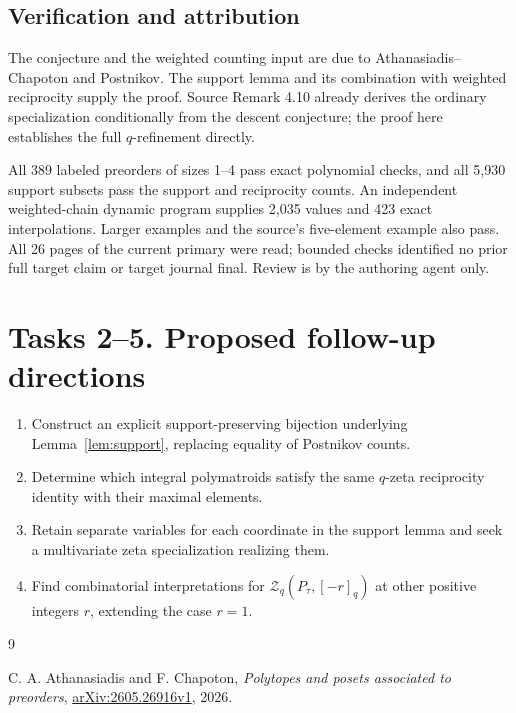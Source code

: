 \documentclass[11pt]{article}
\begin{document}
\subsection*{Verification and attribution}
The conjecture and the weighted counting input are due to
Athanasiadis--Chapoton and Postnikov. The support lemma and its
combination with weighted reciprocity supply the proof. Source
Remark 4.10 already derives the ordinary specialization conditionally
from the descent conjecture; the proof here establishes the full
$q$-refinement directly.

All 389 labeled preorders of sizes 1--4 pass exact polynomial checks,
and all 5,930 support subsets pass the support and reciprocity counts.
An independent weighted-chain dynamic program supplies 2,035 values
and 423 exact interpolations. Larger examples and the source's
five-element example also pass. All 26 pages of the current primary
were read; bounded checks identified no prior full target claim or
target journal final. Review is by the authoring agent only.

\section*{Tasks 2--5. Proposed follow-up directions}
\begin{enumerate}[label=\textbf{Task \arabic*.},start=2,leftmargin=*]
\item Construct an explicit support-preserving bijection underlying
Lemma~\ref{lem:support}, replacing equality of Postnikov counts.
\item Determine which integral polymatroids satisfy the same
$q$-zeta reciprocity identity with their maximal elements.
\item Retain separate variables for each coordinate in the support
lemma and seek a multivariate zeta specialization realizing them.
\item Find combinatorial interpretations for $\mathcal Z_q(P_\tau,[-r]_q)$
at other positive integers $r$, extending the case $r=1$.
\end{enumerate}
\begin{thebibliography}{9}
\raggedright
{} C. A. Athanasiadis and F. Chapoton,
\emph{Polytopes and posets associated to preorders},
\href{https://arxiv.org/abs/2605.26916v1}{arXiv:2605.26916v1}, 2026.
\end{thebibliography}
\end{document}
